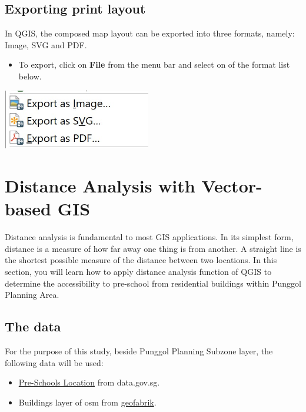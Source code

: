 \documentclass[
  letterpaper,
  DIV=11,
  numbers=noendperiod]{scrreprt}
\providecommand{\tightlist}{%
  \setlength{\itemsep}{0pt}\setlength{\parskip}{0pt}}\usepackage{longtable,booktabs,array}
\begin{document}
\hypertarget{exporting-print-layout}{%
\subsection{Exporting print layout}\label{exporting-print-layout}}

In QGIS, the composed map layout can be exported into three formats,
namely: Image, SVG and PDF.

\begin{itemize}
\tightlist
\item
  To export, click on \textbf{File} from the menu bar and select on of
  the format list below.
\end{itemize}

\includegraphics[width=2.54167in,height=\textheight]{./img04/image91.jpg}

\hypertarget{distance-analysis-with-vector-based-gis}{%
\section{Distance Analysis with Vector-based
GIS}\label{distance-analysis-with-vector-based-gis}}

Distance analysis is fundamental to most GIS applications. In its
simplest form, distance is a measure of how far away one thing is from
another. A straight line is the shortest possible measure of the
distance between two locations. In this section, you will learn how to
apply distance analysis function of QGIS to determine the accessibility
to pre-school from residential buildings within Punggol Planning Area.

\hypertarget{the-data}{%
\subsection{The data}\label{the-data}}

For the purpose of this study, beside Punggol Planning Subzone layer,
the following data will be used:

\begin{itemize}
\tightlist
\item
  \href{https://data.gov.sg/dataset/pre-schools-location}{Pre-Schools
  Location} from data.gov.sg.
\item
  Buildings layer of osm from
  \href{https://download.geofabrik.de/asia/malaysia-singapore-brunei.html}{geofabrik}.
\end{itemize}
\end{document}
